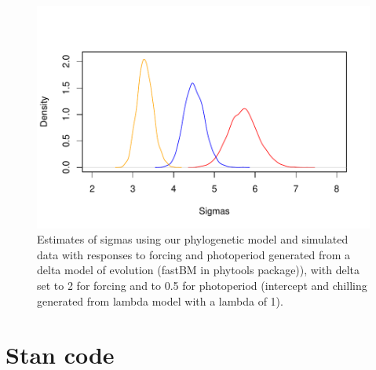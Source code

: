 \documentclass[11pt]{article}
\begin{document}
\clearpage
\begin{figure}
  \begin{center}
  \includegraphics[width=14cm]{../../analyses/phylogeny/figures/burstmodelfigquick.pdf}
  \caption{Estimates of sigmas using our phylogenetic model and simulated data with responses to forcing and photoperiod generated from a delta model of evolution (fastBM in phytools package)), with delta set to 2 for forcing and to 0.5 for photoperiod (intercept and chilling generated from lambda model with a lambda of 1).}
  \label{fig:burstmodels}
  \end{center}
\end{figure}

\section{Stan code}
\begin{verbatim}
\end{verbatim}
\end{document}
